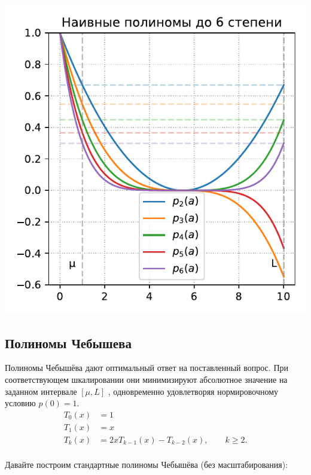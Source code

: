 \documentclass[
  russian,
  letterpaper,
  DIV=11,
  numbers=noendperiod]{scrartcl}
\begin{document}
\includegraphics[width=0.5\columnwidth]{gd_polynom_6_ru.pdf}

\subsection{Полиномы
Чебышева}\label{ux43fux43eux43bux438ux43dux43eux43cux44b-ux447ux435ux431ux44bux448ux435ux432ux430}

Полиномы Чебышёва дают оптимальный ответ на поставленный вопрос. При
соответствующем шкалировании они минимизируют абсолютное значение на
заданном интервале \([\mu,L]\) , одновременно удовлетворяя
нормировочному условию \(p(0)=1\). \[
\begin{aligned}
T_0(x) &= 1\\
T_1(x) &= x\\
T_k(x) &=2xT_{k-1}(x)-T_{k-2}(x),\qquad k\ge 2.\\
\end{aligned}
\]

Давайте построим стандартные полиномы Чебышёва (без масштабирования):
\end{document}
